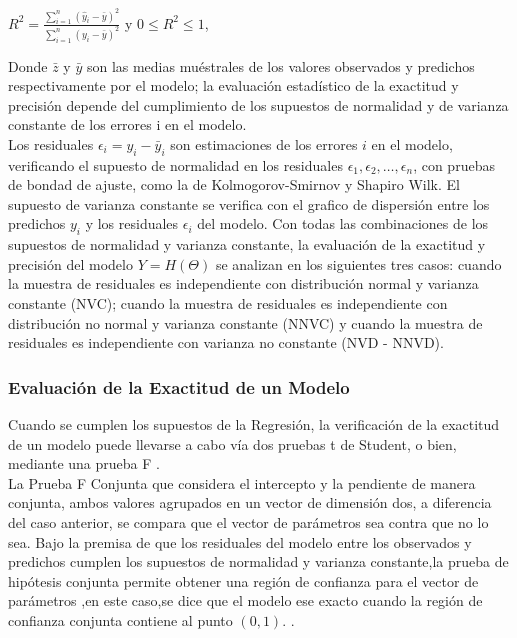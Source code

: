 \begin{center}
	$R^{2} = \frac{ \sum_{i=1}^{n} ( \hat{y}_{i} - \bar{y})^{2}} { \sum_{i=1}^{n} ( y_{i} - \bar{y})^{2}  }$  y  $ 0 \leq R^{2} \leq 1$,
\end{center}


Donde $ \bar{z}$ y $ \bar{y}$ son las medias muéstrales de los valores observados y predichos respectivamente por el modelo; la evaluación estadístico de la exactitud y precisión depende del cumplimiento de los supuestos de normalidad y de varianza constante de los errores i en el modelo. \\


Los residuales $\epsilon_{i} = y_{i} - \bar{y}_{i}$ son estimaciones de los errores $i$ en el modelo, verificando el  supuesto de normalidad en los residuales $\epsilon_{1}, \epsilon_{2} , \dots, \epsilon_{n} $, con pruebas de bondad de ajuste, como la de Kolmogorov-Smirnov y Shapiro Wilk. El supuesto de varianza constante se verifica con el grafico de dispersión entre los predichos $y_{i}$ y los residuales $\epsilon_{i}$ del modelo. Con todas las combinaciones de los supuestos de normalidad y varianza constante, la evaluación de la exactitud y precisión del modelo $Y = H(\Theta )$ se analizan en los siguientes tres casos: cuando la muestra de residuales es independiente con distribución normal y varianza constante (NVC); cuando la muestra de residuales es independiente con distribución no normal y varianza constante (NNVC) y cuando la muestra
de residuales es independiente con varianza no constante (NVD - NNVD).

\subsubsection{Evaluación de la Exactitud de un Modelo}

Cuando se cumplen los supuestos de la Regresión, la verificación de la exactitud de un modelo puede llevarse a cabo vía dos pruebas t de Student, o bien, mediante una prueba F \parencite{balam-2012}.\\

La Prueba F Conjunta que considera el intercepto y la pendiente de manera conjunta, ambos valores agrupados en un vector de dimensión dos, a diferencia del caso anterior, se compara que el vector de parámetros  sea  contra que no lo sea. Bajo la premisa de que los residuales del modelo entre los observados y predichos cumplen los supuestos de normalidad y varianza constante,la prueba de hipótesis conjunta permite obtener una región de confianza para el vector de parámetros ,en este caso,se dice que el modelo ese exacto cuando la región de confianza conjunta contiene al punto $(0,1)$. \parencite{zacarias-2023}.\\

